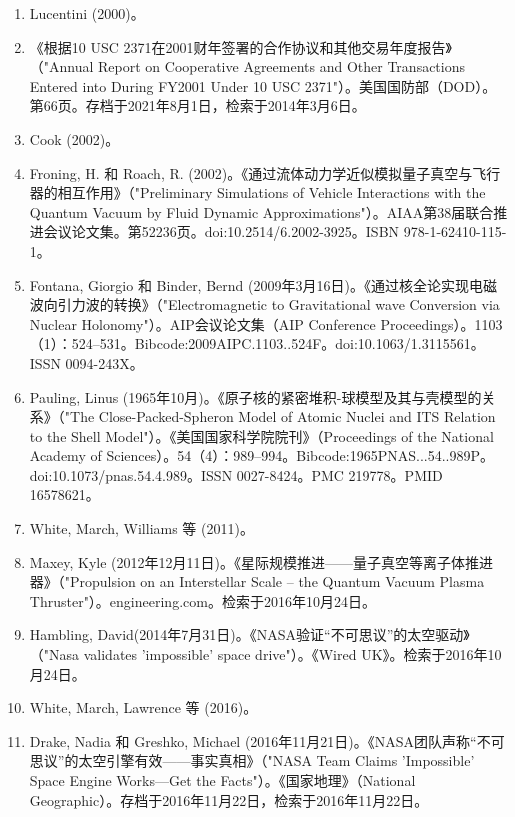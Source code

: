 \begin{enumerate}
\item Lucentini (2000)。
\item 《根据10 USC 2371在2001财年签署的合作协议和其他交易年度报告》（"Annual Report on Cooperative Agreements and Other Transactions Entered into During FY2001 Under 10 USC 2371"）。美国国防部（DOD）。第66页。存档于2021年8月1日，检索于2014年3月6日。
\item Cook (2002)。
\item Froning, H. 和 Roach, R. (2002)。《通过流体动力学近似模拟量子真空与飞行器的相互作用》（"Preliminary Simulations of Vehicle Interactions with the Quantum Vacuum by Fluid Dynamic Approximations"）。AIAA第38届联合推进会议论文集。第52236页。doi:10.2514/6.2002-3925。ISBN 978-1-62410-115-1。
\item Fontana, Giorgio 和 Binder, Bernd (2009年3月16日)。《通过核全论实现电磁波向引力波的转换》（"Electromagnetic to Gravitational wave Conversion via Nuclear Holonomy"）。AIP会议论文集（AIP Conference Proceedings）。1103（1）：524–531。Bibcode:2009AIPC.1103..524F。doi:10.1063/1.3115561。ISSN 0094-243X。
\item Pauling, Linus (1965年10月)。《原子核的紧密堆积-球模型及其与壳模型的关系》（"The Close-Packed-Spheron Model of Atomic Nuclei and ITS Relation to the Shell Model"）。《美国国家科学院院刊》（Proceedings of the National Academy of Sciences）。54（4）：989–994。Bibcode:1965PNAS...54..989P。doi:10.1073/pnas.54.4.989。ISSN 0027-8424。PMC 219778。PMID 16578621。
\item White, March, Williams 等 (2011)。
\item Maxey, Kyle (2012年12月11日)。《星际规模推进——量子真空等离子体推进器》（"Propulsion on an Interstellar Scale – the Quantum Vacuum Plasma Thruster"）。engineering.com。检索于2016年10月24日。
\item Hambling, David(2014年7月31日)。《NASA验证“不可思议”的太空驱动》（"Nasa validates 'impossible' space drive"）。《Wired UK》。检索于2016年10月24日。
\item White, March, Lawrence 等 (2016)。
\item Drake, Nadia 和 Greshko, Michael (2016年11月21日)。《NASA团队声称“不可思议”的太空引擎有效——事实真相》（"NASA Team Claims 'Impossible' Space Engine Works—Get the Facts"）。《国家地理》（National Geographic）。存档于2016年11月22日，检索于2016年11月22日。
\end{enumerate}  
